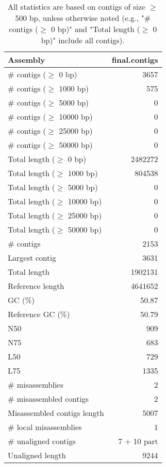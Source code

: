 \documentclass[12pt,a4paper]{article}
\begin{document}
\begin{table}[ht]
\begin{center}
\caption{All statistics are based on contigs of size $\geq$ 500 bp, unless otherwise noted (e.g., "\# contigs ($\geq$ 0 bp)" and "Total length ($\geq$ 0 bp)" include all contigs).}
\begin{tabular}{|l*{1}{|r}|}
\hline
Assembly & final.contigs \\ \hline
\# contigs ($\geq$ 0 bp) & 3657 \\ \hline
\# contigs ($\geq$ 1000 bp) & 575 \\ \hline
\# contigs ($\geq$ 5000 bp) & 0 \\ \hline
\# contigs ($\geq$ 10000 bp) & 0 \\ \hline
\# contigs ($\geq$ 25000 bp) & 0 \\ \hline
\# contigs ($\geq$ 50000 bp) & 0 \\ \hline
Total length ($\geq$ 0 bp) & 2482272 \\ \hline
Total length ($\geq$ 1000 bp) & 804538 \\ \hline
Total length ($\geq$ 5000 bp) & 0 \\ \hline
Total length ($\geq$ 10000 bp) & 0 \\ \hline
Total length ($\geq$ 25000 bp) & 0 \\ \hline
Total length ($\geq$ 50000 bp) & 0 \\ \hline
\# contigs & 2153 \\ \hline
Largest contig & 3631 \\ \hline
Total length & 1902131 \\ \hline
Reference length & 4641652 \\ \hline
GC (\%) & 50.87 \\ \hline
Reference GC (\%) & 50.79 \\ \hline
N50 & 909 \\ \hline
N75 & 683 \\ \hline
L50 & 729 \\ \hline
L75 & 1335 \\ \hline
\# misassemblies & 2 \\ \hline
\# misassembled contigs & 2 \\ \hline
Misassembled contigs length & 5007 \\ \hline
\# local misassemblies & 1 \\ \hline
\# unaligned contigs & 7 + 10 part \\ \hline
Unaligned length & 9244 \\ \hline

\end{tabular}
\end{center}
\end{table}
\end{document}
